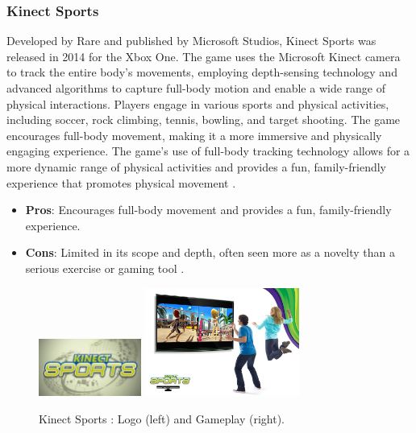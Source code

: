 \documentclass[12pt]{article}
\begin{document}
\subsubsection{Kinect Sports}
Developed by Rare and published by Microsoft Studios, Kinect Sports was released in 2014 for the Xbox One. The game uses the Microsoft Kinect camera to track the entire body's movements, employing depth-sensing technology and advanced algorithms to capture full-body motion and enable a wide range of physical interactions. Players engage in various sports and physical activities, including soccer, rock climbing, tennis, bowling, and target shooting. The game encourages full-body movement, making it a more immersive and physically engaging experience. The game’s use of full-body tracking technology allows for a more dynamic range of physical activities and provides a fun, family-friendly experience that promotes physical movement \cite{kinect2013}.
\begin{itemize}
\item \textbf{Pros}: Encourages full-body movement and provides a fun, family-friendly experience.
\item \textbf{Cons}: Limited in its scope and depth, often seen more as a novelty than a serious exercise or gaming tool \cite{zhang2012}.
\end{itemize}
\begin{figure}[ht]
\centering
\includegraphics[width=0.3\textwidth]{logo-kinect.jpg}
\includegraphics[width=0.45\textwidth]{Market-Kinect.jpg}
\caption{Kinect Sports : Logo (left) and Gameplay (right).}
\end{figure}
\end{document}

